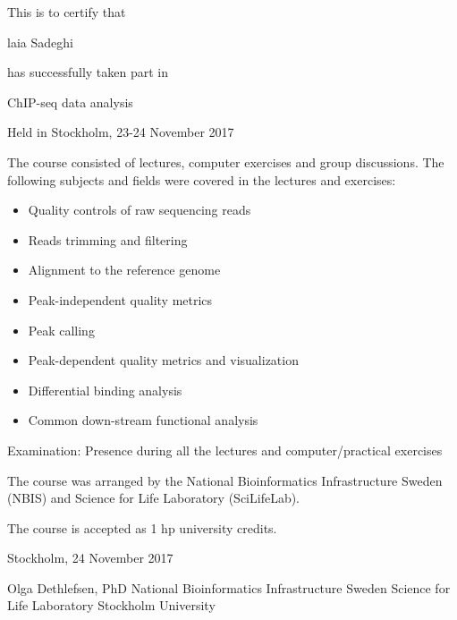 \documentclass[12pt]{article}\usepackage[]{graphicx}\usepackage[]{color}
\newcommand{\courseName}{ChIP-seq data analysis}
\newcommand{\coursePoints}{1 hp}
\newcommand{\courseLocation}{Stockholm}
\newcommand{\courseDate}{23-24 November 2017}
\newcommand{\courseLastDay}{24 November 2017}
\newcommand{\courseExaminer}{Olga Dethlefsen, PhD}
\begin{document}
\large
This is to certify that 


\LARGE
laia Sadeghi

\large
has successfully taken part in \newline

\LARGE
\begin{center}{\courseName}  \end{center} 


\large
\begin{center} Held in {\courseLocation}, {\courseDate} \end{center} 

\vspace{5mm}
\normalsize
The course consisted of lectures, computer exercises and group discussions. The following subjects and fields were covered in the lectures and exercises:
\begin{itemize}
  \item Quality controls of raw sequencing reads
  \item Reads trimming and filtering
  \item Alignment to the reference genome
  \item Peak-independent quality metrics
  \item Peak calling
  \item Peak-dependent quality metrics and visualization
  \item Differential binding analysis
  \item Common down-stream functional analysis
\end{itemize}


\vspace{5mm}
Examination: Presence during all the lectures and computer/practical exercises

\vspace{5mm}
The course was arranged by the National Bioinformatics Infrastructure Sweden (NBIS) and Science for Life Laboratory (SciLifeLab).

The course is accepted as {\coursePoints} university credits.

\vspace{5mm}
{\courseLocation}, {\courseLastDay}
\vspace{20mm}


{\courseExaminer} \newline
\small
National Bioinformatics Infrastructure Sweden \newline
Science for Life Laboratory \newline
Stockholm University \newline
\end{document}
